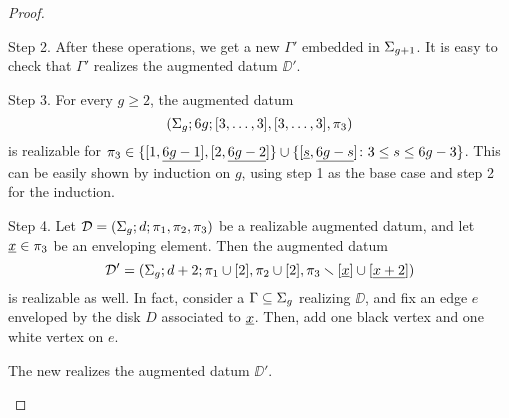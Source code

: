 \begin{proof}
\begin{sideline}{Step 2.}
\egroup
After these operations, we get a new \dessin{} $\Gamma'$ embedded in $\Sigma_{g+1}$. It is easy to check that $\Gamma'$ realizes the augmented datum $\DD'$.
\end{sideline}
\begin{sideline}{Step 3.}
For every $g\ge 2$, the augmented datum 
\[
(\Sigma_{g};6g;[3,\ldots,3],[3,\ldots,3],\pi_3)
\]
is realizable for $\pi_3\in\{[1,\underline{6g-1}],[2,\underline{6g-2}]\}\cup\{[\underline{s},\underline{6g-s}]\colon 3\le s\le 6g-3\}$. This can be easily shown by induction on $g$, using step 1 as the base case and step 2 for the induction.
\end{sideline}
\begin{sideline}{Step 4.}
\def\myscale{1.5}
Let $\mathcal{D}=(\Sigma_{g};d;\pi_1,\pi_2,\pi_3)$ be a realizable augmented datum, and let $\underline{x}\in\pi_3$ be an enveloping element. Then the augmented datum
\[
\mathcal{D}'=(\Sigma_{g};d+2;\pi_1\cup[2],\pi_2\cup[2],\pi_3\smallsetminus[\underline{x}]\cup[\underline{x+2}])
\]
is realizable as well. In fact, consider a \dessin{} $\Gamma\subseteq\Sigma_{g}$ realizing $\DD$, and fix an edge $e$ enveloped by the disk $D$ associated to $\underline{x}$. Then, add one black vertex and one white vertex on $e$.
\begin{center}
\def\picturesetup{
\begin{pgfonlayer}{graph edge below}
\begin{scope}
\clip (-.8,0) to[bend left=90] (.8,0) to[bend left=90] (-.8,0);
\fill[disk 1] circle(3);
\draw[disk 1 boundary enveloped,line width=\edgelinewidth] (-.5,0) pic{black vertex} to (.5,0) pic {white vertex};
\path[black edge] (-.5,0) to (-1,0);
\path[black edge] (.5,0) to (1,0);
\end{scope}
\end{pgfonlayer}
}
\end{center}
The new \dessin{} realizes the augmented datum $\DD'$.
\end{sideline}


\end{proof}
